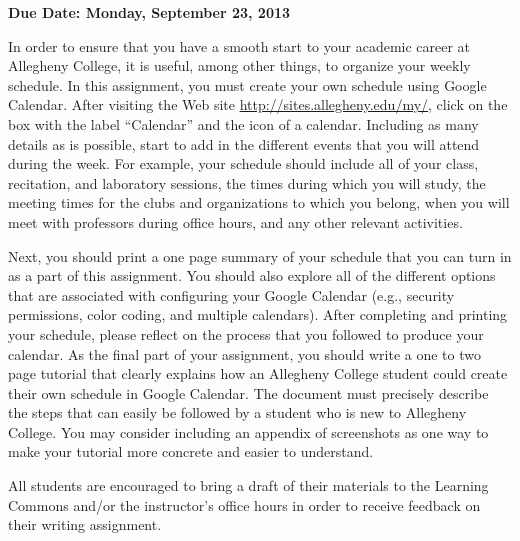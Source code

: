 

\usepackage[compact]{titlesec}



\vspace*{-.2in}
\begin{center}
	{\bf Due Date: Monday, September 23, 2013}
\end{center}

In order to ensure that you have a smooth start to your academic career at Allegheny College, it is useful, among other
things, to organize your weekly schedule. In this assignment, you must create your own schedule using Google Calendar.
After visiting the Web site \url{http://sites.allegheny.edu/my/}, click on the box with the label ``Calendar'' and the
icon of a calendar. Including as many details as is possible, start to add in the different events that you will attend
during the week. For example, your schedule should include all of your class, recitation, and laboratory sessions, the
times during which you will study, the meeting times for the clubs and organizations to which you belong, when you will
meet with professors during office hours, and any other relevant activities.

Next, you should print a one page summary of your schedule that you can turn in as a part of this assignment. You should
also explore all of the different options that are associated with configuring your Google Calendar (e.g., security
permissions, color coding, and multiple calendars). After completing and printing your schedule, please reflect on the
process that you followed to produce your calendar. As the final part of your assignment, you should write a one to two
page tutorial that clearly explains how an Allegheny College student could create their own schedule in Google Calendar.
The document must precisely describe the steps that can easily be followed by a student who is new to Allegheny
College. You may consider including an appendix of screenshots as one way to make your tutorial more concrete and easier
to understand.

All students are encouraged to bring a draft of their materials to the Learning Commons and/or the instructor's office
hours in order to receive feedback on their writing assignment.


